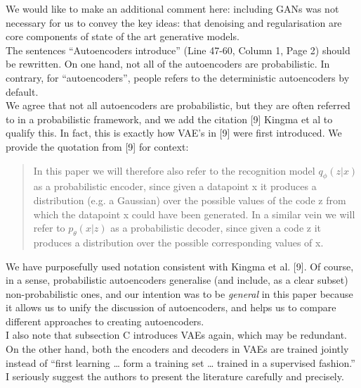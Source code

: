 \documentclass[a4paper,11pt]{article}
\begin{document}
We would like to make an additional comment here: including GANs was not necessary for us to convey the key ideas: that denoising and regularisation are core components of state of the art generative models. \\


{\color{blue}
The sentences ``Autoencoders introduce'' (Line 47-60, Column 1, Page 2) should be rewritten. On one hand, not all of the autoencoders are probabilistic. In contrary, for ``autoencoders'', people refers to the deterministic autoencoders by default.}\\

We agree that not all autoencoders are probabilistic, but they are often referred to in a probabilistic framework, and we add the citation [9] Kingma et al to qualify this. In fact, this is exactly how VAE's in [9] were first introduced.  We provide the quotation from [9] for context:
    
    \begin{quote}
       {\color{green} In this paper we will therefore also refer to the recognition model $q_\phi(z|x)$ as a probabilistic encoder, since given a datapoint x it produces a distribution (e.g. a Gaussian) over the possible values of the code z from which the datapoint x could have been generated. In a similar vein we will refer to $p_\theta(x|z)$ as a probabilistic decoder, since given a code z it produces a distribution over the possible corresponding values of x.}
    \end{quote}

We have purposefully used notation consistent with Kingma et al. [9]. Of course, in a sense, probabilistic autoencoders generalise (and include, as a clear subset) non-probabilistic ones, and our intention was to be {\em general} in this paper because it allows us to unify the discussion of autoencoders, and helps us to compare different approaches to creating autoencoders. \\

 {\color{blue}I also note that subsection C introduces VAEs again, which may be redundant. On the other hand, both the encoders and decoders in VAEs are trained jointly instead of ``first learning … form a training set … trained in a supervised fashion.'' I seriously suggest the authors to present the literature carefully and precisely.}\\
\end{document}
